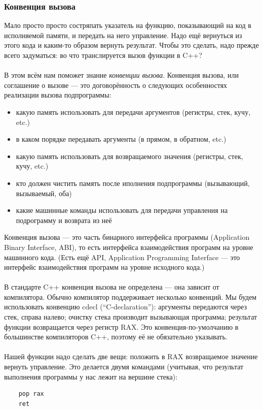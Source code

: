 \documentclass[11pt]{book}
\begin{document}
\subsubsection{Конвенция вызова}
Мало просто просто состряпать указатель на функцию, показывающий на код в исполняемой памяти, и передать на него управление.
Надо ещё вернуться из этого кода и каким-то образом вернуть результат.
Чтобы это сделать, надо прежде всего задуматься: во что транслируется вызов функции в C++?
\\ \\
В этом всём нам поможет знание \emph{конвенции вызова}.
Конвенция вызова, или соглашение о вызове --- это договорённость о следующих особенностях реализации вызова подпрограммы:
\begin{itemize}
\item какую память использовать для передачи аргументов (регистры, стек, кучу, etc.)
\item в каком порядке передавать аргументы (в прямом, в обратном, etc.)
\item какую память использовать для возвращаемого значения (регистры, стек, кучу, etc.)
\item кто должен чистить память после иполнения подпрограммы (вызывающий, вызываемый, оба)
\item какие машинные команды использовать для передачи управления на подрограмму и возврата из неё
\end{itemize}
Конвенция вызова --- это часть бинарного интерфейса программы (Application Binary Interface, ABI),
то есть интерфейса взаимодействия программ на уровне машинного кода.
(Есть ещё API, Application Programming Interface --- это интерфейс взаимодействия программ на уровне исходного кода.)
\\ \\
В стандарте C++ конвенция вызова не определена --- она зависит от компилятора.
Обычно компилятор поддерживает несколько конвенций.
Мы будем использовать конвенцию cdecl (``C-declaration''):
аргументы передаются через стек, справа налево;
очистку стека производит вызывающая программа;
результат функции возвращается через регистр RAX.
Это конвенция-по-умолчанию в большинстве компиляторов C++, поэтому её не обязательно указывать.
\\ \\
Нашей функции надо сделать две вещи: положить в RAX возвращаемое значение вернуть управление.
Это делается двумя командами (учитывая, что результат выполнения программы у нас лежит на вершине стека):
\begin{verbatim}
    pop rax
    ret
\end{verbatim}
\end{document}

